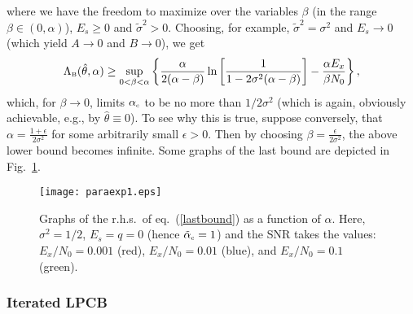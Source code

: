 \documentclass[11pt,epsf]{article}
\newcommand{\tsig}{\tilde{\sigma}}
\newcommand{\ct}{\hat{\theta}}
\begin{document}
where we have the freedom to maximize over the variables $\beta$ (in the range
$\beta\in(0,\alpha)$), $E_s\ge 0$ and
$\tsig^2> 0$. Choosing, for example, $\tsig^2=\sigma^2$ and $E_s\to 0$ (which
yield $A\to 0$ and $B\to 0$), we
get
\begin{equation}
\label{lastbound}
\Lambda_{\mbox{\tiny B}}(\ct,\alpha)
\ge \sup_{0<\beta<\alpha}\left\{\frac{\alpha}{2(\alpha-\beta)}
\ln\left[\frac{1}{1-2\sigma^2(\alpha-\beta)}\right]
-\frac{\alpha E_x}{\beta N_0}\right\},
\end{equation}
which, for $\beta\to 0$, limits $\alpha_{\mbox{\tiny c}}$ to be no more than
$1/2\sigma^2$ 
(which is again, obviously achievable, e.g., by $\ct\equiv
0$). To see why this is true, 
suppose conversely, that $\alpha=\frac{1+\epsilon}{2\sigma^2}$ for some
arbitrarily small $\epsilon > 0$. Then by choosing
$\beta=\frac{\epsilon}{2\sigma^2}$, 
the above lower bound becomes infinite. 
Some graphs of the last bound are depicted in Fig.\ \ref{lowerbound}.

\begin{figure}[h!t!b!]
\centering
\texttt{[image: paraexp1.eps]}
\caption{\small Graphs
of the r.h.s.\ of eq.\ (\ref{lastbound}) as a function of $\alpha$. Here, $\sigma^2=1/2$,
$E_s=q=0$ (hence $\tilde{\alpha}_{\mbox{\tiny c}}=1$) and
the SNR takes the values: $E_x/N_0=0.001$ (red),
$E_x/N_0=0.01$ (blue), and
$E_x/N_0=0.1$ (green).}
\label{lowerbound}
\end{figure}

\subsubsection*{Iterated LPCB}
\end{document}
